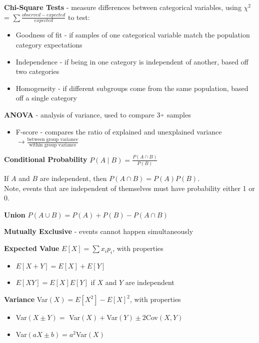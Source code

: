 \documentclass[10pt,landscape]{article}
\newcommand{\plus}{\raisebox{.3\height}{\scalebox{.7}{+}}}
\begin{document}
\begin{multicols}{3}
        \textbf{Chi-Square Tests} - measure differences between categorical variables, using $\chi^2$ = $\sum \frac{observed - expected}{expected}$ to test:
        \begin{itemize}[label={--},leftmargin=4mm]
            \itemsep -.4mm
            \item Goodness of fit - if samples of one categorical variable match the population category expectations
            \item Independence -  if being in one category is independent of another, based off two categories
            \item Homogeneity - if different subgroups come from the same population, based off a single category
        \end{itemize}

        \textbf{ANOVA} - analysis of variance, used to compare 3$\plus$ samples
        \begin{itemize}[label={--},leftmargin=4mm]
            \itemsep -.4mm
            \item F-score - compares the ratio of explained and unexplained variance $\to \frac{\text{between group variance}}{\text{within group variance}}$
        \end{itemize}

        \smallskip

        \textbf{Conditional Probability} $P(A \mid B) = \frac{P(A \cap B)}{P(B)}$

        If $A$ and $B$ are independent, then $P(A \cap B) = P(A) P(B)$.\\
        Note, events that are independent of themselves must have
        probability either 1 or 0.


        \textbf{Union} $P(A \cup B) = P(A) + P(B) - P(A \cap B) $

        \textbf{Mutually Exclusive} - events cannot happen simultaneously
        \smallskip

        \textbf{Expected Value} $E[X] = \sum x_i p_i$, with properties
        \begin{itemize}[label={--},leftmargin=4mm]
            \itemsep -.4mm
            \item $E[X + Y] = E[X] + E[Y]$
            \item $E[XY] = E[X]E[Y]$ if $X$ and $Y$ are independent
        \end{itemize}

        \textbf{Variance} Var$(X) = E[X^2] - E[X]^2$, with properties
        \begin{itemize}[label={--},leftmargin=4mm]
            \itemsep -.4mm
            \item Var$(X\pm Y) =$ Var$(X) +$Var$(Y) \pm 2$Cov$(X,Y)$
            \item Var$(aX \pm b) = a^2$Var$(X)$
        \end{itemize}


\end{multicols}
\end{document}
